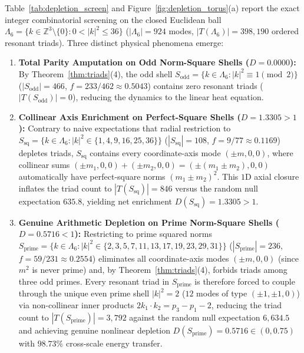 \documentclass[11pt,a4paper]{article}
\theoremstyle{definition}
\theoremstyle{remark}
\begin{document}
Table~\ref{tab:depletion_screen} and Figure~\ref{fig:depletion_torus}(a) report the exact integer combinatorial screening on the closed Euclidean ball $\Lambda_6 = \{k \in \mathbb{Z}^3 \setminus \{0\} : 0 < |k|^2 \le 36\}$ ($|\Lambda_6| = 924$ modes, $|T(\Lambda_6)| = 398{,}190$ ordered resonant triads). Three distinct physical phenomena emerge:
\begin{enumerate}
\item \textbf{Total Parity Amputation on Odd Norm-Square Shells ($D = 0.0000$):} By Theorem~\ref{thm:triads}(4), the odd shell $S_{\mathrm{odd}} = \{k \in \Lambda_6 : |k|^2 \equiv 1 \pmod 2\}$ ($|S_{\mathrm{odd}}| = 466$, $f = 233/462 \approx 0.5043$) contains zero resonant triads ($|T(S_{\mathrm{odd}})| = 0$), reducing the dynamics to the linear heat equation.
\item \textbf{Collinear Axis Enrichment on Perfect-Square Shells ($D = 1.3305 > 1$):} Contrary to naive expectations that radial restriction to $S_{\mathrm{sq}} = \{k \in \Lambda_6 : |k|^2 \in \{1, 4, 9, 16, 25, 36\}\}$ ($|S_{\mathrm{sq}}| = 108$, $f = 9/77 \approx 0.1169$) depletes triads, $S_{\mathrm{sq}}$ contains every coordinate-axis mode $(\pm m, 0, 0)$, where collinear sums $(\pm m_1, 0, 0) + (\pm m_2, 0, 0) = (\pm(m_1 \pm m_2), 0, 0)$ automatically have perfect-square norms $(m_1 \pm m_2)^2$. This $1$D axial closure inflates the triad count to $|T(S_{\mathrm{sq}})| = 846$ versus the random null expectation $635.8$, yielding net enrichment $D(S_{\mathrm{sq}}) = 1.3305 > 1$.
\item \textbf{Genuine Arithmetic Depletion on Prime Norm-Square Shells ($D = 0.5716 < 1$):} Restricting to prime squared norms $S_{\mathrm{prime}} = \{k \in \Lambda_6 : |k|^2 \in \{2,3,5,7,11,13,17,19,23,29,31\}\}$ ($|S_{\mathrm{prime}}| = 236$, $f = 59/231 \approx 0.2554$) eliminates all coordinate-axis modes $(\pm m, 0, 0)$ (since $m^2$ is never prime) and, by Theorem~\ref{thm:triads}(4), forbids triads among three odd primes. Every resonant triad in $S_{\mathrm{prime}}$ is therefore forced to couple through the unique even prime shell $|k|^2 = 2$ ($12$ modes of type $(\pm 1, \pm 1, 0)$) via non-collinear inner products $2 k_1 \cdot k_2 = p_3 - p_1 - 2$, reducing the triad count to $|T(S_{\mathrm{prime}})| = 3{,}792$ against the random null expectation $6{,}634.5$ and achieving genuine nonlinear depletion $D(S_{\mathrm{prime}}) = 0.5716 \in (0, 0.75)$ with $98.73\%$ cross-scale energy transfer.
\end{enumerate}
\end{document}
